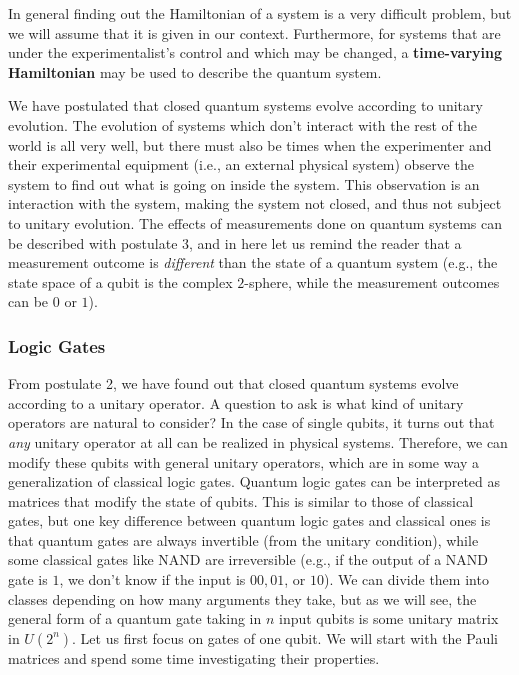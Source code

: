 \documentclass{article}
\theoremstyle{definition}
\begin{document}
    In general finding out the Hamiltonian of a system is a very difficult problem, but we will assume that it is given in our context. Furthermore, for systems that are under the experimentalist's control and which may be changed, a \textbf{time-varying Hamiltonian} may be used to describe the quantum system. 

    We have postulated that closed quantum systems evolve according to unitary evolution. The evolution of systems which don't interact with the rest of the world is all very well, but there must also be times when the experimenter and their experimental equipment (i.e., an external physical system) observe the system to find out what is going on inside the system. This observation is an interaction with the system, making the system not closed, and thus not subject to unitary evolution. The effects of measurements done on quantum systems can be described with postulate 3, and in here let us remind the reader that a measurement outcome is \textit{different} than the state of a quantum system (e.g., the state space of a qubit is the complex $2$-sphere, while the measurement outcomes can be $0$ or $1$).

    \subsubsection{Logic Gates}

      From postulate 2, we have found out that closed quantum systems evolve according to a unitary operator. A question to ask is what kind of unitary operators are natural to consider? In the case of single qubits, it turns out that \textit{any} unitary operator at all can be realized in physical systems. Therefore, we can modify these qubits with general unitary operators, which are in some way a generalization of classical logic gates. Quantum logic gates can be interpreted as matrices that modify the state of qubits. This is similar to those of classical gates, but one key difference between quantum logic gates and classical ones is that quantum gates are always invertible (from the unitary condition), while some classical gates like NAND are irreversible (e.g., if the output of a NAND gate is $1$, we don't know if the input is $00, 01$, or $10$). We can divide them into classes depending on how many arguments they take, but as we will see, the general form of a quantum gate taking in $n$ input qubits is some unitary matrix in $U(2^n)$. Let us first focus on gates of one qubit. We will start with the Pauli matrices and spend some time investigating their properties.  
\end{document}

